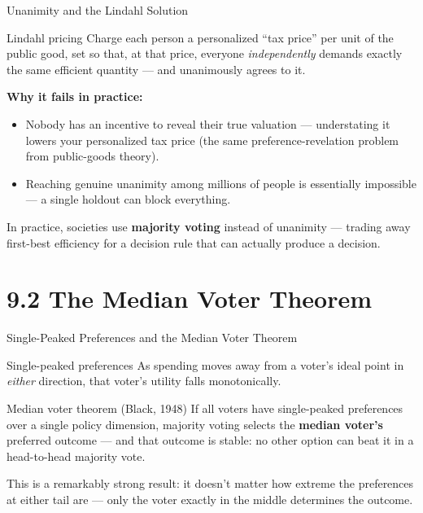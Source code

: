 \documentclass[11pt,aspectratio=169]{beamer}
\begin{document}
\begin{frame}{Unanimity and the Lindahl Solution}
  \begin{block}{Lindahl pricing}
    Charge each person a personalized ``tax price'' per unit of the public good, set so that, at that price, everyone \emph{independently} demands exactly the same efficient quantity --- and unanimously agrees to it.
  \end{block}
  \vspace{0.4em}
  \textbf{Why it fails in practice:}
  \begin{itemize}
    \item Nobody has an incentive to reveal their true valuation --- understating it lowers your personalized tax price (the same preference-revelation problem from public-goods theory).
    \item Reaching genuine unanimity among millions of people is essentially impossible --- a single holdout can block everything.
  \end{itemize}
  \small In practice, societies use \textbf{majority voting} instead of unanimity --- trading away first-best efficiency for a decision rule that can actually produce a decision.
\end{frame}

\section{9.2 The Median Voter Theorem}

\begin{frame}{Single-Peaked Preferences and the Median Voter Theorem}
  \begin{block}{Single-peaked preferences}
    As spending moves away from a voter's ideal point in \emph{either} direction, that voter's utility falls monotonically.
  \end{block}
  \begin{block}{Median voter theorem (Black, 1948)}
    If all voters have single-peaked preferences over a single policy dimension, majority voting selects the \textbf{median voter's} preferred outcome --- and that outcome is stable: no other option can beat it in a head-to-head majority vote.
  \end{block}
  \small This is a remarkably strong result: it doesn't matter how extreme the preferences at either tail are --- only the voter exactly in the middle determines the outcome.
\end{frame}
\end{document}
